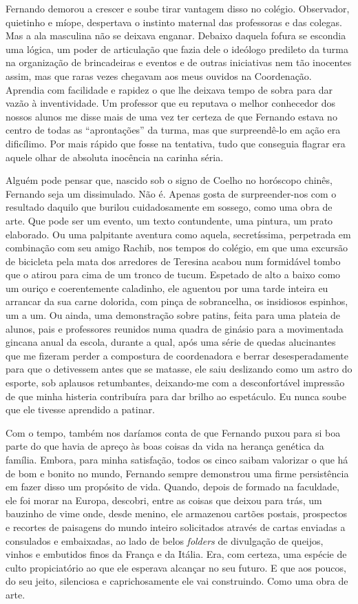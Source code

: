 Fernando demorou a crescer e soube tirar vantagem disso no colégio.
Observador, quietinho e míope, despertava o instinto maternal das professoras e das colegas.
Mas a ala masculina não se deixava enganar.
Debaixo daquela fofura se escondia uma lógica, um poder de articulação que fazia dele o ideólogo predileto da turma na organização de brincadeiras e eventos e de outras iniciativas nem tão inocentes assim, mas que raras vezes chegavam aos meus ouvidos na Coordenação.
Aprendia com facilidade e rapidez o que lhe deixava tempo de sobra para dar vazão à inventividade.
Um professor que eu reputava o melhor conhecedor dos nossos alunos me disse mais de uma vez ter certeza de que Fernando estava no centro de todas as ``aprontações'' da turma, mas que surpreendê-lo em ação era dificílimo.
Por mais rápido que fosse na tentativa, tudo que conseguia flagrar era aquele olhar de absoluta inocência na carinha séria.

Alguém pode pensar que, nascido sob o signo de Coelho no horóscopo chinês, Fernando seja um dissimulado.
Não é.
Apenas gosta de surpreender-nos com o resultado daquilo que burilou cuidadosamente em sossego, como uma obra de arte.
Que pode ser um evento, um texto contundente, uma pintura, um prato elaborado.
Ou uma palpitante aventura como aquela, secretíssima, perpetrada em combinação com seu amigo Rachib, nos tempos do colégio, em que uma excursão de bicicleta pela mata dos arredores de Teresina acabou num formidável tombo que o atirou para cima de um tronco de tucum.
Espetado de alto a baixo como um ouriço e coerentemente caladinho, ele aguentou por uma tarde inteira eu arrancar da sua carne dolorida, com pinça de sobrancelha, os insidiosos espinhos, um a um.
Ou ainda, uma demonstração sobre patins, feita para uma plateia de alunos, pais e professores reunidos numa quadra de ginásio para a movimentada gincana anual da escola, durante a qual, após uma série de quedas alucinantes que me fizeram perder a compostura de coordenadora e berrar desesperadamente para que o detivessem antes que se matasse, ele saiu deslizando como um astro do esporte, sob aplausos retumbantes, deixando-me com a desconfortável impressão de que minha histeria contribuíra para dar brilho ao espetáculo.
Eu nunca soube que ele tivesse aprendido a patinar.

Com o tempo, também nos daríamos conta de que Fernando puxou para si boa parte do que havia de apreço às boas coisas da vida na herança genética da família.
Embora, para minha satisfação, todos os cinco saibam valorizar o que há de bom e bonito no mundo, Fernando sempre demonstrou uma firme persistência em fazer disso um propósito de vida.
Quando, depois de formado na faculdade, ele foi morar na Europa, descobri, entre as coisas que deixou para trás, um bauzinho de vime onde, desde menino, ele armazenou cartões postais, prospectos e recortes de paisagens do mundo inteiro solicitados através de cartas enviadas a consulados e embaixadas, ao lado de belos \textit{folders} de divulgação de queijos, vinhos e embutidos finos da França e da Itália.
Era, com certeza, uma espécie de culto propiciatório ao que ele esperava alcançar no seu futuro.
E que aos poucos, do seu jeito, silenciosa e caprichosamente ele vai construindo.
Como uma obra de arte.


